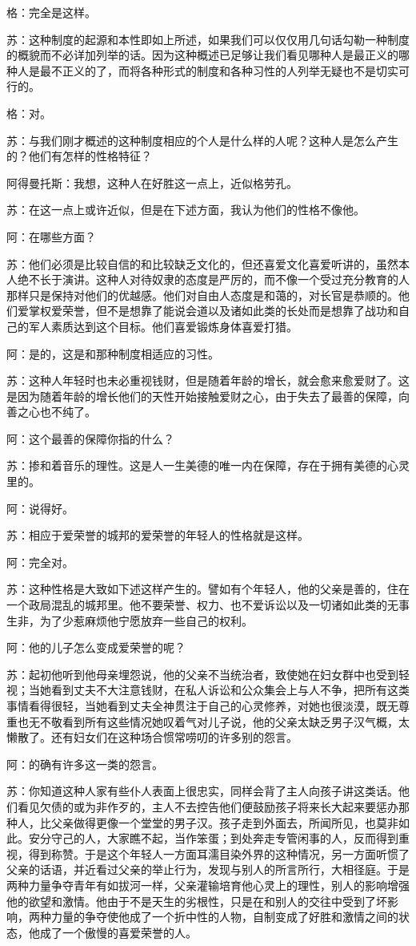 \documentclass[12pt,oneside]{book}
\begin{document}
格：完全是这样。

苏：这种制度的起源和本性即如上所述，如果我们可以仅仅用几句话勾勒一种制度的概貌而不必详加列举的话。因为这种概述已足够让我们看见哪种人是最正义的哪种人是最不正义的了，而将各种形式的制度和各种习性的人列举无疑也不是切实可行的。

格：对。

苏：与我们刚才概述的这种制度相应的个人是什么样的人呢？这种人是怎么产生的？他们有怎样的性格特征？

阿得曼托斯：我想，这种人在好胜这一点上，近似格劳孔。

苏：在这一点上或许近似，但是在下述方面，我认为他们的性格不像他。

阿：在哪些方面？

苏：他们必须是比较自信的和比较缺乏文化的，但还喜爱文化喜爱听讲的，虽然本人绝不长于演讲。这种人对待奴隶的态度是严厉的，而不像一个受过充分教育的人那样只是保持对他们的优越感。他们对自由人态度是和蔼的，对长官是恭顺的。他们爱掌权爱荣誉，但不是想靠了能说会道以及诸如此类的长处而是想靠了战功和自己的军人素质达到这个目标。他们喜爱锻炼身体喜爱打猎。

阿：是的，这是和那种制度相适应的习性。

苏：这种人年轻时也未必重视钱财，但是随着年龄的增长，就会愈来愈爱财了。这是因为随着年龄的增长他们的天性开始接触爱财之心，由于失去了最善的保障，向善之心也不纯了。

阿：这个最善的保障你指的什么？

苏：掺和着音乐的理性。这是人一生美德的唯一内在保障，存在于拥有美德的心灵里的。

阿：说得好。

苏：相应于爱荣誉的城邦的爱荣誉的年轻人的性格就是这样。

阿：完全对。

苏：这种性格是大致如下述这样产生的。譬如有个年轻人，他的父亲是善的，住在一个政局混乱的城邦里。他不要荣誉、权力、也不爱诉讼以及一切诸如此类的无事生非，为了少惹麻烦他宁愿放弃一些自己的权利。

阿：他的儿子怎么变成爱荣誉的呢？

苏：起初他听到他母亲埋怨说，他的父亲不当统治者，致使她在妇女群中也受到轻视；当她看到丈夫不大注意钱财，在私人诉讼和公众集会上与人不争，把所有这类事情看得很轻，当她看到丈夫全神贯注于自己的心灵修养，对她也很淡漠，既无尊重也无不敬看到所有这些情况她叹着气对儿子说，他的父亲太缺乏男子汉气概，太懒散了。还有妇女们在这种场合惯常唠叨的许多别的怨言。

阿：的确有许多这一类的怨言。

苏：你知道这种人家有些仆人表面上很忠实，同样会背了主人向孩子讲这类话。他们看见欠债的或为非作歹的，主人不去控告他们便鼓励孩子将来长大起来要惩办那种人，比父亲做得更像一个堂堂的男子汉。孩子走到外面去，所闻所见，也莫非如此。安分守己的人，大家瞧不起，当作笨蛋；到处奔走专管闲事的人，反而得到重视，得到称赞。于是这个年轻人一方面耳濡目染外界的这种情况，另一方面听惯了父亲的话语，并近看过父亲的举止行为，发现与别人的所言所行，大相径庭。于是两种力量争夺青年有如拔河一样，父亲灌输培育他心灵上的理性，别人的影响增强他的欲望和激情。他由于不是天生的劣根性，只是在和别人的交往中受到了坏影响，两种力量的争夺使他成了一个折中性的人物，自制变成了好胜和激情之间的状态，他成了一个傲慢的喜爱荣誉的人。
\end{document}
